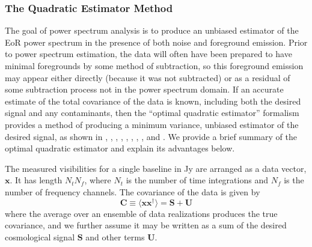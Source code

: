 \documentclass[preprint2,numberedappendix,tighten]{aastex6}  %
\begin{document}
\subsubsection{The Quadratic Estimator Method}
\label{sec:QE}


The goal of power spectrum analysis is to produce an unbiased estimator of the EoR power spectrum in the presence of both noise and foreground emission. Prior to power spectrum estimation, the data will often have been prepared to have minimal foregrounds by some method of subtraction, so this foreground emission may appear either directly (because it was not subtracted) or as a residual of some subtraction process not in the power spectrum domain. If an accurate estimate of the total covariance of the data is known, including both the desired signal and any contaminants, then the ``optimal quadratic estimator'' formalism provides a method of producing a minimum variance, unbiased estimator of the desired signal, as shown in 
\citet{liu_tegmark2011}, \citet{dillon_et_al2013a}, \citet{liu_et_al2014a}, \citet{liu_et_al2014b}, \citet{trott_et_al2012}, \citet{dillon_et_al2014}, \citet{dillon_et_al2015}, \citet{switzer_et_al2015}, and \citet{trott_et_al2016}. 
We provide a brief summary of the optimal quadratic estimator and explain its advantages below.

The measured visibilities for a single baseline in Jy are arranged as a data vector, $\textbf{x}$. It has length $N_{t} N_{f}$,
where $N_{t}$ is the number of time integrations and $N_{f}$ is the number of frequency channels. The covariance of the data is given by 
\begin{equation}
\textbf{C} \equiv \langle\textbf{xx}^{\dagger}\rangle = \textbf{S} + \textbf{U}
\end{equation}
where the average over an ensemble of data realizations produces the true covariance, and we further assume it may be written as a sum of the desired cosmological signal $\textbf{S}$ and other terms $\textbf{U}$.  
\end{document}
